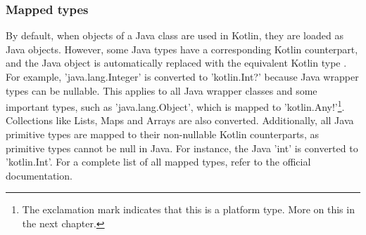 \documentclass[a4paper, 11pt]{article}
\begin{document}
  \subsubsection{Mapped types}
    By default, when objects of a Java class are used in Kotlin, they are loaded as Java objects. However, some Java types have a corresponding Kotlin counterpart, and the Java object is automatically replaced with the equivalent Kotlin type \cite{interop-mapped-types}. For example, 'java.lang.Integer' is converted to 'kotlin.Int?' because Java wrapper types can be nullable. This applies to all Java wrapper classes and some important types, such as 'java.lang.Object', which is mapped to 'kotlin.Any!'\footnote{The exclamation mark indicates that this is a platform type. More on this in the next chapter.}. Collections like Lists, Maps and Arrays are also converted. Additionally, all Java primitive types are mapped to their non-nullable Kotlin counterparts, as primitive types cannot be null in Java. For instance, the Java 'int' is converted to 'kotlin.Int'. For a complete list of all mapped types, refer to the official documentation.
\end{document}

